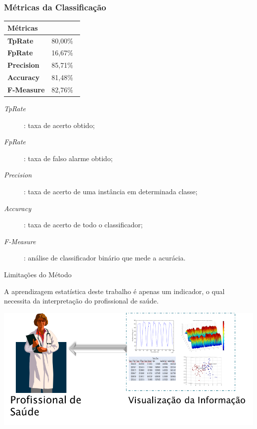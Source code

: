 \documentclass{beamer}
\begin{document}
\begin{frame}
   \frametitle{Métricas da Classificação}
   \begin{block}{}
   		\begin{table}[!htbp]
				\label{table:metricasmatrizconfusao}
				\centering
				\begin{tabular}{|l|r|}
				\hline
				\multicolumn{2}{|l|}{\textbf{Métricas}} \\ \hline
				\textbf{TpRate}                    & 80,00$\%$\                 \\ \hline
				\textbf{FpRate}                    & 16,67$\%$\                \\ \hline
				\textbf{Precision}                 & 85,71$\%$\                \\ \hline
				\textbf{Accuracy}                  & 81,48$\%$\                \\ \hline
				\textbf{F-Measure}                 & 82,76$\%$\                \\ \hline
				\end{tabular}
				\end{table}
	\end{block}
     \begin{block}{}
				\begin{description}
				\item [\textit{TpRate}]: taxa de acerto obtido;
				\item [\textit{FpRate}]: taxa de falso alarme obtido;
				\item [\textit{Precision}]: taxa de acerto de uma instância em determinada classe;
				\item [\textit{Accuracy}]: taxa de acerto de todo o classificador;
				\item [\textit{F-Measure}]: análise de classificador binário que mede a acurácia.
				\end{description}
    \end{block}
\end{frame}

\begin{frame}{Limitações do Método}
	\begin{block}{}
	A aprendizagem estatística deste trabalho é apenas um indicador, o qual necessita da interpretação do profissional de saúde.
	\end{block}
  \begin{block}{}
      \center \includegraphics[height=1 in]{img/visualizacaomedico.png}
  \end{block}
\end{frame}
\end{document}
